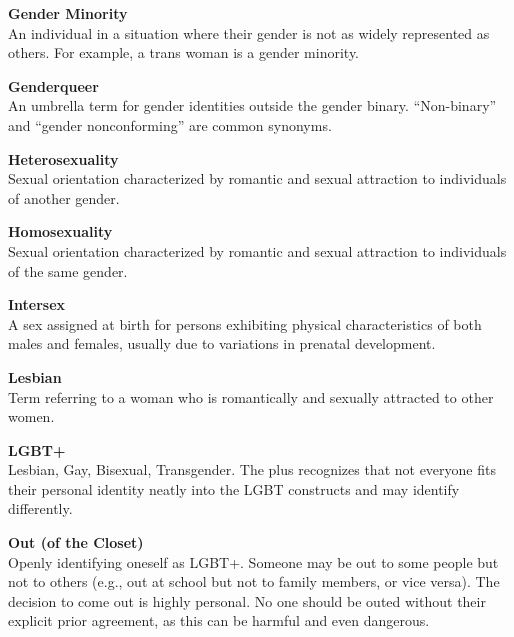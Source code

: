 \begin{titlepage}
\noindent\textbf{Gender Minority}\\
An individual in a situation where their gender is not as widely represented as others. For example, a trans woman is a gender minority.\vspace*{\baselineskip}

\noindent\textbf{Genderqueer}\\
An umbrella term for gender identities outside the gender binary. ``Non-binary'' and ``gender nonconforming'' are common synonyms. \vspace*{\baselineskip}

\noindent\textbf{Heterosexuality}\\
Sexual orientation characterized by romantic and sexual attraction to individuals of another gender.\vspace*{\baselineskip}

\noindent\textbf{Homosexuality}\\
Sexual orientation characterized by romantic and sexual attraction to individuals of the same gender.\vspace*{\baselineskip}

\noindent\textbf{Intersex}\\
A { sex} assigned at birth for persons exhibiting physical characteristics of both males and females, usually due to variations in prenatal development.\vspace*{\baselineskip}

\noindent\textbf{Lesbian}\\
Term referring to a woman who is romantically and sexually attracted to other women.\vspace*{\baselineskip}

\noindent\textbf{LGBT+}\\
Lesbian, Gay, Bisexual, Transgender. The plus recognizes that not everyone fits their personal identity neatly into the LGBT constructs and may identify differently.  \vspace*{\baselineskip}

\newpage

\noindent\textbf{Out (of the Closet)}\\
Openly identifying oneself as LGBT+. Someone may be out to some people but not to others (e.g., out at school but not to family members, or vice versa). The decision to come out is highly personal. No one should be outed without their explicit prior agreement, as this can be harmful and even dangerous.\vspace*{\baselineskip}


\end{titlepage}
